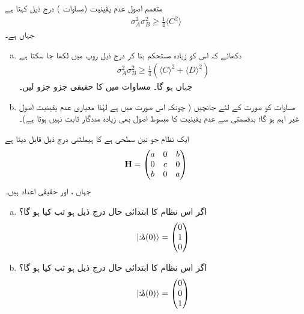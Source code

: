 \quad متعمم اصول عدم یقینیت (مساوات ) درج ذیل کہتا ہے
 \begin{align*} 
\sigma_{A}^{2}\sigma_{B}^{2}\geq\frac{1}{4}\langle C^{2} \rangle 
 \end{align*} 
جہاں  ہے۔
\begin{enumerate}[a.] 
\item
دکھائے کہ اس کو زیادہ مستحکم بنا کر درج ذیل روپ میں لکھا جا سکتا ہے
 \begin{align}\label{مساوات_سوال_مستحکم_عدم_یقینیت} 
\sigma_{A}^{2}\sigma_{B}^{2}\geq\frac{1}{4}(\langle C\rangle^{2}+\langle D \rangle ^{2}) 
 \end{align} 
جہاں  ہو گا۔  مساوات  میں  کا حقیقی جزو  جزو لیں۔ 
\item
مساوات  کو  صورت کے لئے جانچیں ( چونکہ اس صورت میں  ہے لہٰذا معیاری عدم یقینیت اصول غیر اہم ہو گا؛ بدقسمتی سے عدم یقینیت کا مبسوط اصول بھی زیادہ مددگار ثابت نہیں ہوتا ہے)۔ 
\end{enumerate}

ایک نظام جو تین سطحی ہے کا ہیملٹنی درج ذیل قابل دیتا ہے
 \begin{align*} 
\operatorname{\mathbf{H}}=\begin{pmatrix}
a&0&b\\
0&c&0\\
b&0&a
\end{pmatrix} 
 \end{align*} 
جہاں ،  اور  حقیقی اعداد ہیں۔
\begin{enumerate}[a.]
 \item
 اگر اس نظام کا ابتدائی حال درج ذیل ہو تب  کیا ہو گا؟ 
 \begin{align*} 
|\s(0) \rangle=\begin{pmatrix}
0\\
1\\
0
\end{pmatrix} 
 \end{align*} 
\item
 اگر اس نظام کا ابتدائی حال درج ذیل ہو تب  کیا ہو گا؟ 
 \begin{align*} 
| \s(0)\rangle =\begin{pmatrix}
0\\
0\\
1
\end{pmatrix} 
 \end{align*} 
\end{enumerate}

